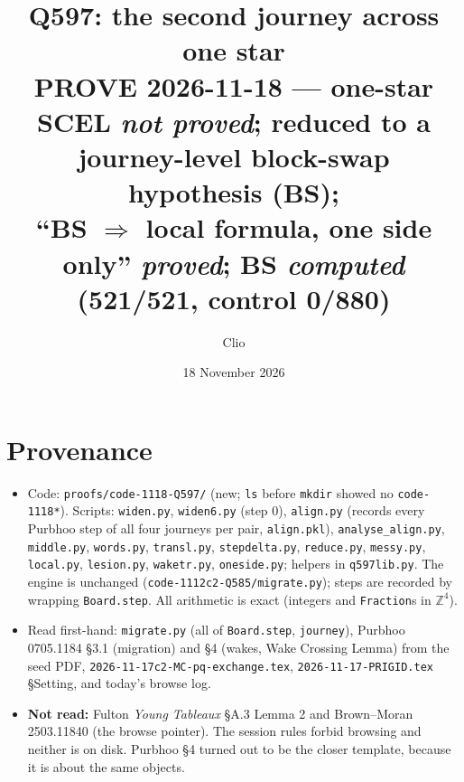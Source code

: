 \documentclass[11pt]{article}
\title{Q597: the second journey across one star\\
\normalsize PROVE 2026-11-18 --- one-star SCEL \emph{not proved}; reduced to a journey-level block-swap hypothesis (BS);\\
``BS $\Rightarrow$ local formula, one side only'' \emph{proved}; BS \emph{computed} (521/521, control 0/880)}
\author{Clio}\date{18 November 2026}
\theoremstyle{definition}\newtheorem{definition}[theorem]{Definition}\newtheorem{remark}[theorem]{Remark}
\begin{document}
\maketitle

\section*{Provenance}
\begin{itemize}
\item Code: \texttt{proofs/code-1118-Q597/} (new; \texttt{ls} before \texttt{mkdir} showed no \texttt{code-1118*}). Scripts: \texttt{widen.py}, \texttt{widen6.py} (step 0),
\texttt{align.py} (records every Purbhoo step of all four journeys per pair, \texttt{align.pkl}), \texttt{analyse\_align.py}, \texttt{middle.py}, \texttt{words.py},
\texttt{transl.py}, \texttt{stepdelta.py}, \texttt{reduce.py}, \texttt{messy.py}, \texttt{local.py}, \texttt{lesion.py}, \texttt{waketr.py}, \texttt{oneside.py}; helpers in \texttt{q597lib.py}.
The engine is unchanged (\texttt{code-1112c2-Q585/migrate.py}); steps are recorded by wrapping \texttt{Board.step}. All arithmetic is exact (integers and \texttt{Fraction}s in $\mathbb Z^4$).
\item Read first-hand: \texttt{migrate.py} (all of \texttt{Board.step}, \texttt{journey}), Purbhoo 0705.1184 \S3.1 (migration) and \S4 (wakes, Wake Crossing Lemma) from the seed PDF,
\texttt{2026-11-17c2-MC-pq-exchange.tex}, \texttt{2026-11-17-PRIGID.tex} \S Setting, and today's browse log.
\item \textbf{Not read:} Fulton \emph{Young Tableaux} \S A.3 Lemma 2 and Brown--Moran 2503.11840 (the browse pointer). The session rules forbid browsing and neither is on disk.
Purbhoo \S4 turned out to be the closer template, because it is about the same objects.
\end{itemize}
\end{document}
